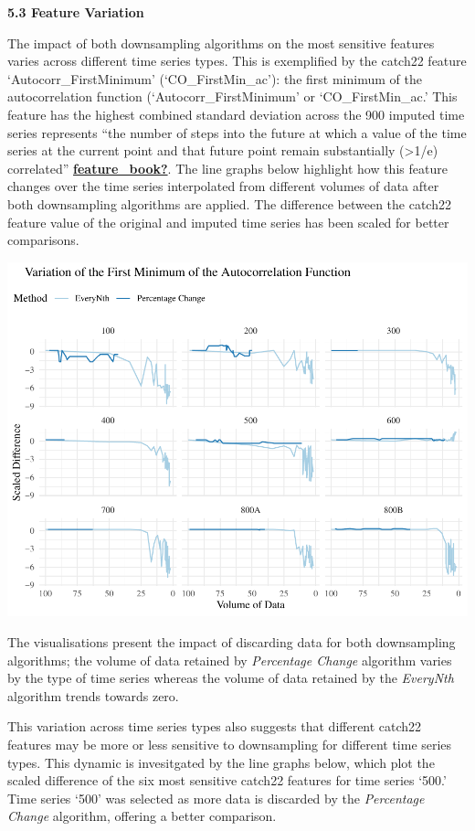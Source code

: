\documentclass{article}
\begin{document}
\textbf{5.3 Feature Variation}

The impact of both downsampling algorithms on the most sensitive
features varies across different time series types. This is exemplified
by the catch22 feature `Autocorr\_FirstMinimum' (`CO\_FirstMin\_ac'):
the first minimum of the autocorrelation function
(`Autocorr\_FirstMinimum' or `CO\_FirstMin\_ac.' This feature has the
highest combined standard deviation across the 900 imputed time series
represents ``the number of steps into the future at which a value of the
time series at the current point and that future point remain
substantially (\textgreater1/e) correlated''
\protect\hyperlink{ref-feature_book}{\textbf{feature\_book?}}. The line
graphs below highlight how this feature changes over the time series
interpolated from different volumes of data after both downsampling
algorithms are applied. The difference between the catch22 feature value
of the original and imputed time series has been scaled for better
comparisons.

\includegraphics{210431461_CSC8639_Dissertation_files/figure-latex/FirstMinimum-1.pdf}

The visualisations present the impact of discarding data for both
downsampling algorithms; the volume of data retained by \emph{Percentage
Change} algorithm varies by the type of time series whereas the volume
of data retained by the \emph{EveryNth} algorithm trends towards zero.

This variation across time series types also suggests that different
catch22 features may be more or less sensitive to downsampling for
different time series types. This dynamic is invesitgated by the line
graphs below, which plot the scaled difference of the six most sensitive
catch22 features for time series `500.' Time series `500' was selected
as more data is discarded by the \emph{Percentage Change} algorithm,
offering a better comparison.
\end{document}
